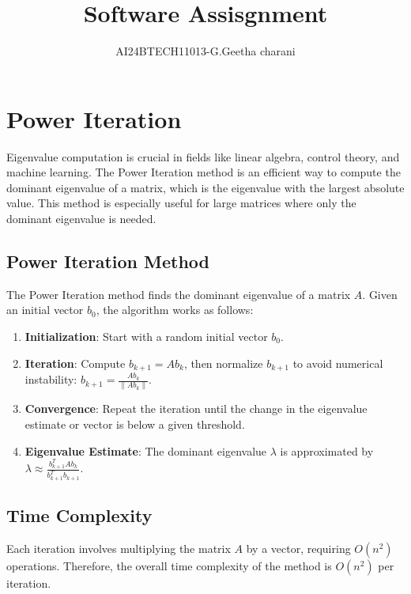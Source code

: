 \documentclass[journal]{IEEEtran}
\begin{document}

\vspace{3cm}

\title{Software Assisgnment}
\author{AI24BTECH11013-G.Geetha charani}
\maketitle
\bigskip

\renewcommand{\thefigure}{\theenumi}
\renewcommand{\thetable}{\theenumi}
\section{\textbf{Power Iteration}}
Eigenvalue computation is crucial in fields like linear algebra, control theory, and machine learning. The Power Iteration method is an efficient way to compute the dominant eigenvalue of a matrix, which is the eigenvalue with the largest absolute value. This method is especially useful for large matrices where only the dominant eigenvalue is needed.

\subsection{Power Iteration Method}
The Power Iteration method finds the dominant eigenvalue of a matrix $A$. Given an initial vector $b_0$, the algorithm works as follows:

\begin{enumerate}
    \item \textbf{Initialization}: Start with a random initial vector $b_0$.
    \item \textbf{Iteration}: Compute $b_{k+1} = A b_k$, then normalize $b_{k+1}$ to avoid numerical instability: $b_{k+1} = \frac{A b_k}{\|A b_k\|}$.
    \item \textbf{Convergence}: Repeat the iteration until the change in the eigenvalue estimate or vector is below a given threshold.
    \item \textbf{Eigenvalue Estimate}: The dominant eigenvalue $ \lambda $ is approximated by
    $
    \lambda \approx \frac{b_{k+1}^T A b_k}{b_{k+1}^T b_{k+1}}.
    $
\end{enumerate}

\subsection{Time Complexity}
Each iteration involves multiplying the matrix $A$ by a vector, requiring $O(n^2)$ operations. Therefore, the overall time complexity of the method is $O(n^2)$ per iteration.
\end{document}
